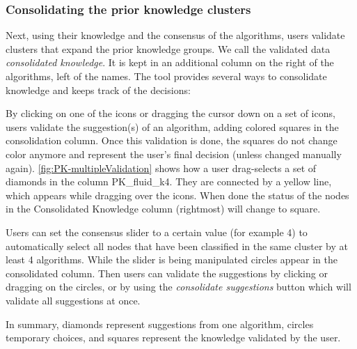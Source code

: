 \subsubsection{Consolidating the prior knowledge clusters}
\label{sec:validating-pk}

Next, using their knowledge and the consensus of the algorithms, users validate clusters that expand the prior knowledge groups. We call the validated data \emph{consolidated knowledge}. It is kept in an additional column on the right of the algorithms, left of the names. The tool provides several ways to consolidate knowledge and keeps track of the decisions:


\begin{description}[leftmargin=0pt,nosep]

\item [Partial Copy.] By clicking on one of the icons or dragging the cursor down on a set of icons, users validate the suggestion(s) of an algorithm, adding colored squares in the consolidation column. Once this validation is done, the squares do not change color anymore and represent the user's final decision (unless changed manually again). \autoref{fig:PK-multipleValidation} shows how a user drag-selects a set of diamonds in the column PK\_fluid\_k4. They are connected by a yellow line, which appears while dragging over the icons.
When done the status of the nodes in the Consolidated Knowledge column (rightmost) will change to square.

\item [Consensus slider.] Users can set the consensus slider to a certain value (for example 4) to automatically select all nodes that have been classified in the same cluster by at least 4 algorithms. While the slider is being manipulated circles appear in the consolidated column.  Then users can validate the suggestions by clicking or dragging on the circles, or by using the \emph{consolidate suggestions} button which will validate all suggestions at once.
\item In summary, diamonds represent suggestions from one algorithm, circles temporary choices, and squares represent the knowledge validated by the user.





\end{description}
